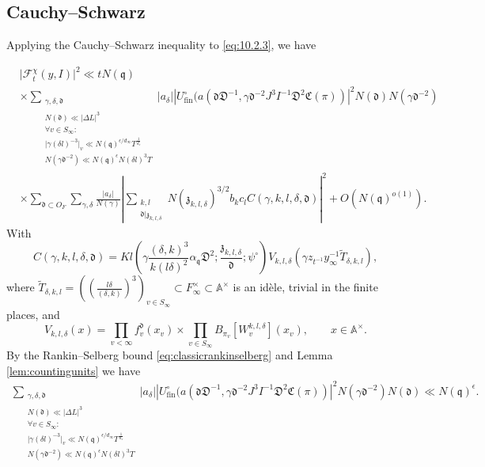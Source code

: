 \documentclass[a4paper,11pt]{amsart}
\theoremstyle{definition}
\newcommand{\N}{\mathbb{N}}
\newcommand{\A}{\mathbb{A}}
\newcommand{\fin}{\text{fin}}
\begin{document}
\subsection{Cauchy--Schwarz}
Applying the Cauchy--Schwarz inequality to \eqref{eq:10.2.3}, we have

\begin{align*}\label{eq:FTcauchyschwartz}
    &\vert{\mathcal{F}^{\chi}_t(y,I)}\vert^2 \ll tN(\mathfrak{q})\nonumber\\&  \times\sum_{\substack{\gamma,\delta,\mathfrak{d}\\\\ N(\mathfrak{d})\ll \vert{\Delta L}\vert^3\\\forall v\in S_{\infty}:\\\vert{\gamma(\delta l)^{-3}}\vert_v\ll N(\mathfrak{q})^{\epsilon/d_{\infty}}T^{\frac{1}{d_v}}\\N(\gamma\mathfrak{d}^{-2})\ll N(\mathfrak{q})^{\epsilon}N(\delta l)^3T}} \vert{a_{\delta}}\vert\left\vert{U_{\fin}^{\circ}(a(\mathfrak{d}\mathfrak{D}^{-1},\gamma \mathfrak{d}^{-2}J^3I^{-1}\mathfrak{D}^2\mathfrak{C}(\pi))}\right\vert^2N(\mathfrak{d}) N(\gamma\mathfrak{d}^{-2})\nonumber\\ &
    \times \sum_{\mathfrak{d}\subset O_F}\sum_{\gamma,\delta}\frac{\vert{a_{\delta}}\vert}{N(\gamma)}\left\vert{\sum_{\substack{k,l\\\mathfrak{d}|\mathfrak{z}_{k,l,\delta}}}N(\mathfrak{z}_{k,l,\delta})^{3/2}b_kc_lC(\gamma,k,l,\delta,\mathfrak{d})}\right\vert^2 + O(N(\mathfrak{q})^{o(1)}).
\end{align*}
With \[C(\gamma,k,l,\delta,\mathfrak{d})=Kl\left(\gamma \frac{(\delta,k)^3}{k({l\delta})^{2}}\alpha_{\mathfrak{q}}\mathfrak{D}^2;\frac{\mathfrak{z}_{k,l,\delta}}{\mathfrak{d}};\psi^{\circ}\right)V_{k,l,\delta}\left(\gamma z_{t^{-1}}y_{\infty}^{-1}\tilde{T}_{\delta,k,l}\right),\]
where $\tilde{T}_{\delta,k,l}=\left(\left(\frac{l\delta}{(\delta,k)}\right)^{3}\right)_{v\in S_{\infty}} \subset F_{\infty}^{\times} \subset \A^{\times}$ is an idèle, trivial in the finite places, and
\[V_{k,l,\delta}(x) = \prod_{v<\infty}f_v^{\mathfrak{d}}(x_v)\times \prod_{v\in S_{\infty}}B_{\pi_v}[W_v^{k,l,\delta}](x_v), \qquad x \in \A^{\times}.\] 
By the Rankin--Selberg bound \eqref{eq:classicrankinselberg} and Lemma \ref{lem:countingunits} we have 
\begin{align*}\sum_{\substack{\gamma,\delta,\mathfrak{d}\\\\ N(\mathfrak{d})\ll \vert{\Delta L}\vert^3\\\forall v\in S_{\infty}:\\\vert{\gamma(\delta l)^{-3}}\vert_v\ll N(\mathfrak{q})^{\epsilon/d_{\infty}}T^{\frac{1}{d_v}}\\N(\gamma\mathfrak{d}^{-2})\ll N(\mathfrak{q})^{\epsilon}N(\delta l)^3T}} \vert{a_{\delta}}\vert\left\vert{U_{\fin}^{\circ}(a(\mathfrak{d}\mathfrak{D}^{-1},\gamma \mathfrak{d}^{-2}J^3I^{-1}\mathfrak{D}^2\mathfrak{C}(\pi))}\right\vert^2N(\gamma\mathfrak{d}^{-2})N(\mathfrak{d}) 
\ll N(\mathfrak{q})^{\epsilon}.
\end{align*}
\end{document}
